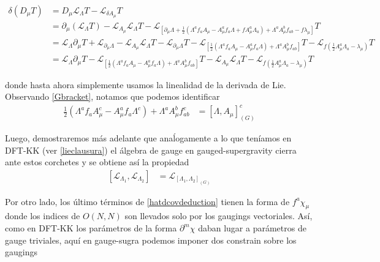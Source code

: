 \documentclass{article}
\numberwithin{equation}{section}
\begin{document}
\begin{align}
\delta\left(D_{\mu}T\right) & =D_{\mu}\mathcal{L}_{\Lambda}T-\mathcal{\mathcal{L}}_{\delta A_{\mu}}T\nonumber \\
& =\partial_{\mu}\left(\mathcal{L}_{\Lambda}T\right)-\mathcal{L}_{A_{\mu}}\mathcal{L}_{\Lambda}T-\mathcal{L}_{\left[\partial_{\mu}\Lambda+\frac{1}{2}\left(\Lambda^{a}f_{a}A_{\mu}-A_{\mu}^{a}f_{a}\Lambda+fA_{\mu}^{a}\Lambda_{a}\right)+\Lambda^{a}A_{\mu}^{b}f_{ab}-f\lambda_{\mu}\right]}T\nonumber \\
& =\mathcal{L}_{\Lambda}\partial_{\mu}T+\mathcal{L}_{\partial_{\mu}\Lambda}-\mathcal{L}_{A_{\mu}}\mathcal{L}_{\Lambda}T-\mathcal{L}_{\partial_{\mu}\Lambda}T-\mathcal{L}_{\left[\frac{1}{2}\left(\Lambda^{a}f_{a}A_{\mu}-A_{\mu}^{a}f_{a}\Lambda\right)+\Lambda^{a}A_{\mu}^{b}f_{ab}\right]}T-\mathcal{L}_{f\left(\frac{1}{2}A_{\mu}^{a}\Lambda_{a}-\lambda_{\mu}\right)}T\nonumber \\
& =\mathcal{L}_{\Lambda}\partial_{\mu}T-\mathcal{L}_{\left[\frac{1}{2}\left(\Lambda^{a}f_{a}A_{\mu}-A_{\mu}^{a}f_{a}\Lambda\right)+\Lambda^{a}A_{\mu}^{b}f_{ab}\right]}T-\mathcal{L}_{A_{\mu}}\mathcal{L}_{\Lambda}T-\mathcal{L}_{f\left(\frac{1}{2}A_{\mu}^{a}\Lambda_{a}-\lambda_{\mu}\right)}T\label{hatdcovdeduction}
\end{align}


donde hasta ahora simplemente usamos la linealidad de la derivada
de Lie. Observando \ref{Gbracket}, notamos que 
podemos identificar
\begin{align*}
\frac{1}{2}\left(\Lambda^{a}f_{a}A_{\mu}^{c}-A_{\mu}^{a}f_{a}\Lambda^{c}\right)+\Lambda^{a}A_{\mu}^{b}f_{ab}^{c} & =\left[\Lambda,A_{\mu}\right]_{(G)}^{c}
\end{align*}


Luego, demostraremos más adelante que anaĺogamente a lo que teníamos
en DFT-KK (ver \ref{lieclausura}) el álgebra de gauge en gauged-supergravity
cierra ante estos corchetes y se obtiene así la propiedad
\begin{align}
\left[\mathcal{L}_{\Lambda_{1}},\mathcal{L}_{\Lambda_{2}}\right] & =\mathcal{L}_{\left[\Lambda_{1},\Lambda_{2}\right]_{(G)}}\label{gslieclausure}
\end{align}


Por otro lado, los último términos de \ref{hatdcovdeduction} tienen
la forma de $f^{a}\chi_{\mu}$ donde los indices de $O(N,N)$ son
llevados solo por los gaugings vectoriales. Así, como en DFT-KK los
parámetros de la forma $\partial^{m}\chi$ daban lugar a parámetros
de gauge triviales, aquí en gauge-sugra podemos imponer dos constrain
sobre los gaugings
\end{document}
